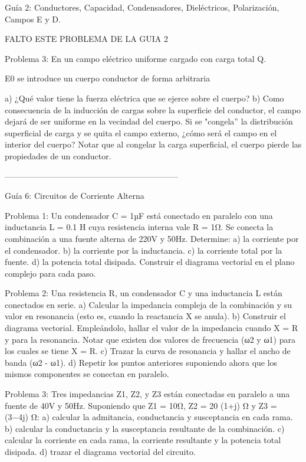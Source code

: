 
Guía 2: Conductores, Capacidad, Condensadores, Dieléctricos, Polarización, Campos E y D.

FALTO ESTE PROBLEMA DE LA GUIA 2

 
Problema 3:
En un campo eléctrico uniforme cargado con carga total Q.

E0    se introduce un cuerpo conductor de forma arbitraria
 
a)	¿Qué valor tiene la fuerza eléctrica que se ejerce sobre el cuerpo?
b)	Como consecuencia de la inducción de cargas sobre la superficie del conductor, el campo dejará de ser uniforme en la vecindad del cuerpo. Si se "congela'' la distribución superficial de carga y se quita el campo externo, ¿cómo será el campo en el interior del cuerpo? Notar que al congelar la carga superficial, el cuerpo pierde las propiedades de un conductor.


---------------------------------------------------------------


Guía 6: Circuitos de Corriente Alterna

Problema 1:
Un condensador C = 1µF está conectado en paralelo con una inductancia L = 0.1 H cuya resistencia interna vale R = 1Ω. Se conecta la combinación a una fuente alterna de 220V y 50Hz. Determine:
a)	la corriente por el condensador.
b)	la corriente por la inductancia.
c)	la corriente total por la fuente.
d)	la potencia total disipada.
Construir el diagrama vectorial en el plano complejo para cada paso.



Problema 2:
Una resistencia R, un condensador C y una inductancia L están conectados en serie.
a)	Calcular la impedancia compleja de la combinación y su valor en resonancia (esto es, cuando la reactancia X se anula).
b)	Construir el diagrama vectorial. Empleándolo, hallar el valor de la impedancia cuando X = R y para la resonancia. Notar que existen dos valores de frecuencia (ω2 y ω1) para los cuales se tiene X = R.
c)	Trazar la curva de resonancia y hallar el ancho de banda (ω2 - ω1).
d)	Repetir los puntos anteriores suponiendo ahora que los mismos componentes se conectan
en paralelo.



Problema 3:
Tres impedancias Z1, Z2, y Z3  están conectadas en paralelo a una fuente de 40V y 50Hz. Suponiendo que  Z1 = 10Ω, Z2 = 20 (1+j) Ω y Z3 = (3−4j) Ω:
a)	calcular la admitancia, conductancia y susceptancia en cada rama.
b)	calcular la conductancia y la susceptancia resultante de la combinación.
c)	calcular la corriente en cada rama, la corriente resultante y la potencia total disipada.
d)	trazar el diagrama vectorial del circuito.



